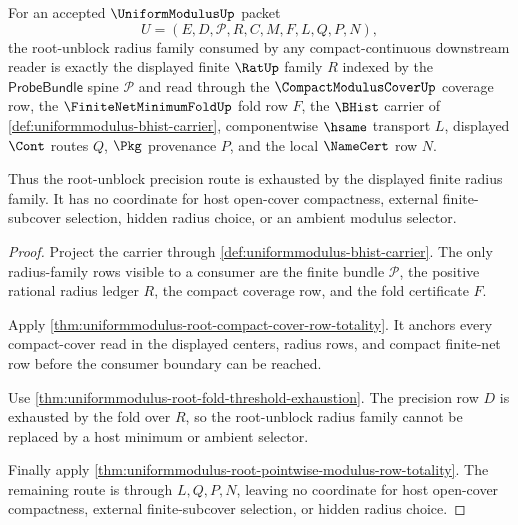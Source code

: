 \begin{theorem}
\label{thm:uniformmodulus-root-unblock-radius-family-exhaustion}
For an accepted $\UniformModulusUp$ packet
$$
U=(E,D,\mathcal{P},R,C,M,F,L,Q,P,N),
$$
the root-unblock radius family consumed by any compact-continuous downstream reader is exactly the displayed finite $\RatUp$ family $R$ indexed by the $\mathsf{ProbeBundle}$ spine $\mathcal{P}$ and read through the $\CompactModulusCoverUp$ coverage row, the $\FiniteNetMinimumFoldUp$ fold row $F$, the $\BHist$ carrier of \autoref{def:uniformmodulus-bhist-carrier}, componentwise $\hsame$ transport $L$, displayed $\Cont$ routes $Q$, $\Pkg$ provenance $P$, and the local $\NameCert$ row $N$.

Thus the root-unblock precision route is exhausted by the displayed finite radius family. It has no coordinate for host open-cover compactness, external finite-subcover selection, hidden radius choice, or an ambient modulus selector.
\end{theorem}
\begin{proof}
Project the carrier through \autoref{def:uniformmodulus-bhist-carrier}. The only radius-family rows visible to a consumer are the finite bundle $\mathcal{P}$, the positive rational radius ledger $R$, the compact coverage row, and the fold certificate $F$.

Apply \autoref{thm:uniformmodulus-root-compact-cover-row-totality}. It anchors every compact-cover read in the displayed centers, radius rows, and compact finite-net row before the consumer boundary can be reached.

Use \autoref{thm:uniformmodulus-root-fold-threshold-exhaustion}. The precision row $D$ is exhausted by the fold over $R$, so the root-unblock radius family cannot be replaced by a host minimum or ambient selector.

Finally apply \autoref{thm:uniformmodulus-root-pointwise-modulus-row-totality}. The remaining route is through $L,Q,P,N$, leaving no coordinate for host open-cover compactness, external finite-subcover selection, or hidden radius choice.
\end{proof}

